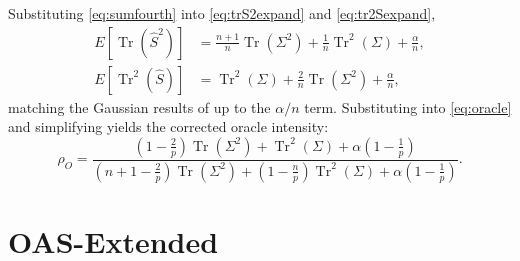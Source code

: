 \documentclass[journal]{IEEEtran}
\begin{document}
Substituting \eqref{eq:sumfourth} into \eqref{eq:trS2expand} and \eqref{eq:tr2Sexpand},
\begin{align}
E[\operatorname{Tr}(\hat{S}^2)] &= \tfrac{n+1}{n}\operatorname{Tr}(\Sigma^2)
  +\tfrac{1}{n}\operatorname{Tr}^2(\Sigma)+\tfrac{\alpha}{n}, \label{eq:trS2}\\
E[\operatorname{Tr}^2(\hat{S})] &= \operatorname{Tr}^2(\Sigma)
  +\tfrac{2}{n}\operatorname{Tr}(\Sigma^2)+\tfrac{\alpha}{n}, \label{eq:tr2S}
\end{align}
matching the Gaussian results of \cite{OAS} up to the $\alpha/n$ term.
Substituting into \eqref{eq:oracle} and simplifying yields the corrected oracle intensity:
\begin{equation}
\label{opt_rho}
\rho_O = \frac{(1-\tfrac{2}{p})\operatorname{Tr}(\Sigma^2)+\operatorname{Tr}^2(\Sigma)+\alpha(1-\tfrac{1}{p})}{(n+1-\tfrac{2}{p})\operatorname{Tr}(\Sigma^2)+(1-\tfrac{n}{p})\operatorname{Tr}^2(\Sigma)+\alpha(1-\tfrac{1}{p})}.
\end{equation}

\section{OAS-Extended}\label{sec-extension}
\end{document}
